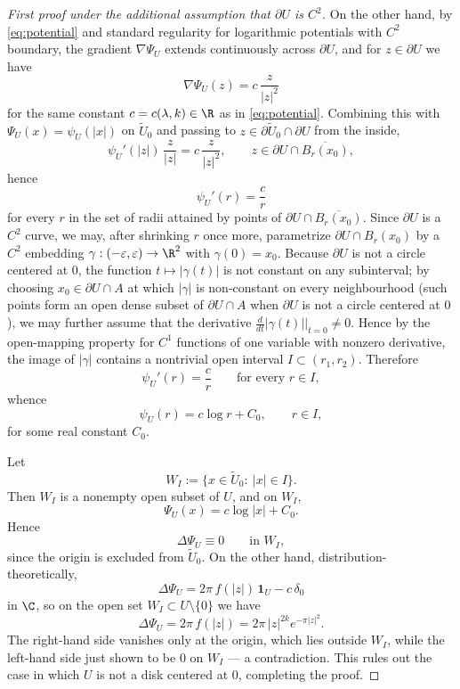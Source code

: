 \begin{proof}[First proof under the additional assumption that $\partial U$ is $C^2$]
On the other hand, by \eqref{eq:potential} and standard regularity for
logarithmic potentials with $C^2$ boundary, the gradient $\nabla\Psi_U$
extends continuously across $\partial U$, and for $z\in\partial U$ we
have
\[
\nabla \Psi_U(z)=c\,\frac{z}{|z|^2}
\]
for the same constant $c=c(\lambda,k)\in \R$ as in
\eqref{eq:potential}. Combining this with $\Psi_U(x)=\psi_U(|x|)$ on
$\widetilde U_0$ and passing to $z\in \partial \widetilde U_0\cap
\partial U$ from the inside,
\[
\psi_U'(|z|)\,\frac{z}{|z|}=c\,\frac{z}{|z|^2},
\qquad z\in \partial U\cap \overline{B_r(x_0)},
\]
hence
\[
\psi_U'(r)=\frac{c}{r}
\]
for every $r$ in the set of radii attained by points of
$\partial U\cap \overline{B_r(x_0)}$. Since $\partial U$ is a $C^2$
curve, we may, after shrinking $r$ once more, parametrize
$\partial U\cap B_r(x_0)$ by a $C^2$ embedding
$\gamma:(-\varepsilon,\varepsilon)\to \R^2$ with $\gamma(0)=x_0$.
Because $\partial U$ is not a circle centered at $0$, the function
$t\mapsto |\gamma(t)|$ is not constant on any subinterval; by choosing
$x_0\in\partial U\cap A$ at which $|\gamma|$ is non-constant on every
neighbourhood (such points form an open dense subset of $\partial
U\cap A$ when $\partial U$ is not a circle centered at $0$), we may
further assume that the derivative
$\frac{d}{dt}|\gamma(t)|\big|_{t=0}\ne 0$. Hence by the open-mapping
property for $C^1$ functions of one variable with nonzero derivative,
the image of $|\gamma|$ contains a nontrivial open interval
\(I\subset (r_1,r_2)\).
Therefore
\[
\psi_U'(r)=\frac{c}{r}
\qquad\text{for every }r\in I,
\]
whence
\[
\psi_U(r)=c\log r+C_0,
\qquad r\in I,
\]
for some real constant $C_0$.

Let
\[
W_I:=\{x\in \widetilde U_0:\ |x|\in I\}.
\]
Then \(W_I\) is a nonempty open subset of \(U\), and on \(W_I\),
\[
\Psi_U(x)=c\log|x|+C_0.
\]
Hence
\[
\Delta \Psi_U\equiv 0 \qquad \text{in } W_I,
\]
since the origin is excluded from $\widetilde U_0$. On the other hand,
distribution-theoretically,
\[
\Delta \Psi_U=2\pi\, f(|z|)\,\mathbf{1}_U-c\,\delta_0
\]
in $\C$, so on the open set $W_I\subset U\setminus\{0\}$ we have
\[
\Delta \Psi_U=2\pi\, f(|z|)=2\pi\, |z|^{2k}e^{-\pi |z|^2}.
\]
The right-hand side vanishes only at the origin, which lies outside
$W_I$, while the left-hand side just shown to be $0$ on $W_I$ — a
contradiction. This rules out the case in which $U$ is not a disk
centered at $0$, completing the proof.
\end{proof}

